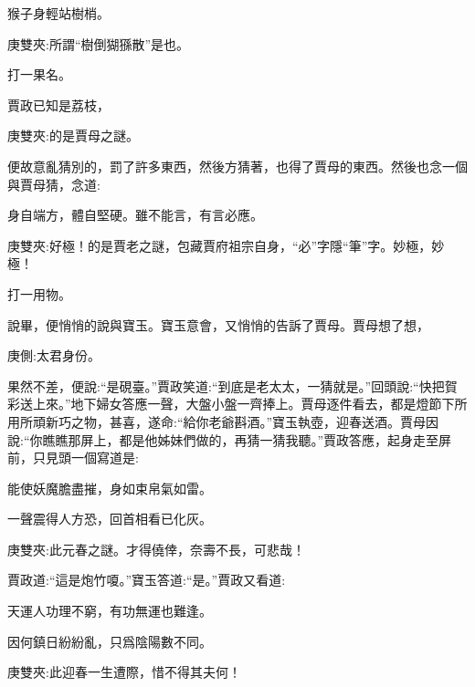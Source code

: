 \begin{parag}
    猴子身輕站樹梢。\begin{note}庚雙夾:所謂“樹倒猢猻散”是也。\end{note}打一果名。
\end{parag}


\begin{parag}
    賈政已知是荔枝，\begin{note}庚雙夾:的是賈母之謎。\end{note}便故意亂猜別的，罰了許多東西，然後方猜著，也得了賈母的東西。然後也念一個與賈母猜，念道:
\end{parag}


\begin{parag}
    身自端方，體自堅硬。雖不能言，有言必應。\begin{note}庚雙夾:好極！的是賈老之謎，包藏賈府祖宗自身，“必”字隱“筆”字。妙極，妙極！\end{note}打一用物。
\end{parag}


\begin{parag}
    說畢，便悄悄的說與寶玉。寶玉意會，又悄悄的告訴了賈母。賈母想了想，\begin{note}庚側:太君身份。\end{note}果然不差，便說:“是硯臺。”賈政笑道:“到底是老太太，一猜就是。”回頭說:“快把賀彩送上來。”地下婦女答應一聲，大盤小盤一齊捧上。賈母逐件看去，都是燈節下所用所頑新巧之物，甚喜，遂命:“給你老爺斟酒。”寶玉執壺，迎春送酒。賈母因說:“你瞧瞧那屏上，都是他姊妹們做的，再猜一猜我聽。”賈政答應，起身走至屏前，只見頭一個寫道是:
\end{parag}


\begin{poem}
    \begin{pl}能使妖魔膽盡摧，身如束帛氣如雷。\end{pl}

    \begin{pl}一聲震得人方恐，回首相看已化灰。\end{pl}
    \begin{note}庚雙夾:此元春之謎。才得僥倖，奈壽不長，可悲哉！\end{note}
\end{poem}


\begin{parag}
    賈政道:“這是炮竹嗄。”寶玉答道:“是。”賈政又看道:
\end{parag}


\begin{poem}
    \begin{pl}天運人功理不窮，有功無運也難逢。\end{pl}

    \begin{pl}因何鎮日紛紛亂，只爲陰陽數不同。\end{pl}
    \begin{note}庚雙夾:此迎春一生遭際，惜不得其夫何！\end{note}
\end{poem}


